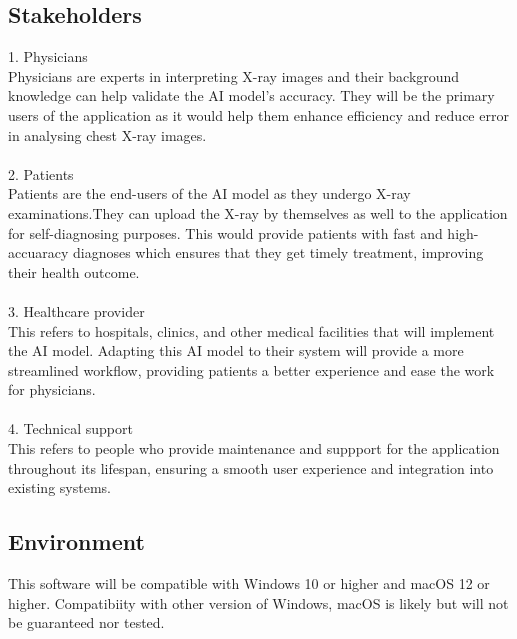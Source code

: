 \documentclass{article}
\begin{document}
\subsection{Stakeholders}
1. Physicians \\
Physicians are experts in interpreting X-ray images and their background knowledge can help validate the AI model's accuracy. They will be the primary users of the application as it would help them enhance efficiency and reduce error in analysing chest X-ray images. \\
\\
2. Patients\\
Patients are the end-users of the AI model as they undergo X-ray examinations.They can upload the X-ray by themselves as well to the application for self-diagnosing purposes. This would provide patients with fast and high-accuaracy diagnoses which ensures that they get timely treatment, improving their health outcome.\\
\\
3. Healthcare provider\\
This refers to  hospitals, clinics, and other medical facilities that will implement the AI model. Adapting this AI model to their system will provide a more streamlined workflow, providing patients a better experience and ease the work for physicians. \\
\\
4. Technical support\\
This refers to people who provide maintenance and suppport for the application throughout its lifespan, ensuring a smooth user experience and integration into existing systems.
\\
\subsection{Environment}
This software will be compatible with Windows 10 or higher and macOS 12 or higher. Compatibiity with other version of Windows, macOS is likely but will not be guaranteed nor tested.\\

\newpage
\end{document}
